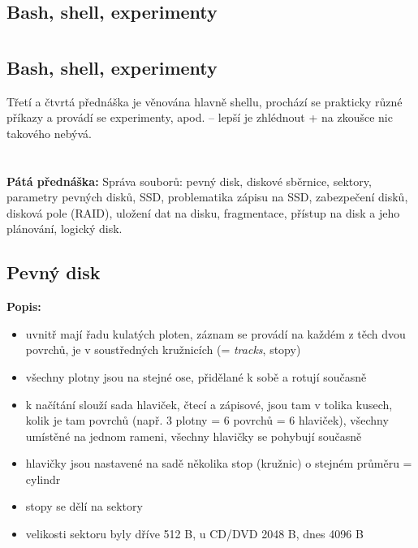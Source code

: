 \documentclass[a4paper, 11pt]{article}
\begin{document}
\section{}
\subsection{Bash, shell, experimenty}
\section{}
\subsection{Bash, shell, experimenty}
Třetí a čtvrtá přednáška je věnována hlavně shellu, prochází se prakticky různé příkazy a provádí se experimenty, apod. -- lepší je zhlédnout + na zkoušce nic takového nebývá.

\newpage

\section{}
\textbf{Pátá přednáška:} Správa souborů: pevný disk, diskové sběrnice, sektory, parametry pevných disků, SSD, problematika zápisu na SSD, zabezpečení disků, disková pole (RAID), uložení dat na disku, fragmentace, přístup na disk a jeho plánování, logický disk.

\subsection{Pevný disk}
\textbf{Popis:}
\begin{itemize}
    \item uvnitř mají řadu kulatých ploten, záznam se provádí na každém z těch dvou povrchů, je v soustředných kružnicích (= \emph{tracks}, stopy)
    \item všechny plotny jsou na stejné ose, přidělané k sobě a rotují současně
    \item k načítání slouží sada hlaviček, čtecí a zápisové, jsou tam v tolika kusech, kolik je tam povrchů (např. 3 plotny = 6 povrchů = 6 hlaviček), všechny umístěné na jednom rameni, všechny hlavičky se pohybují současně
    \item hlavičky jsou nastavené na sadě několika stop (kružnic) o stejném průměru = cylindr
    \item stopy se dělí na sektory
    \item velikosti sektoru byly dříve 512 B, u CD/DVD 2048 B, dnes 4096 B
\end{itemize}
\end{document}
